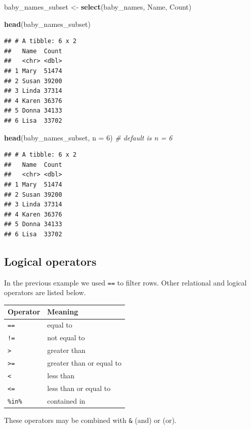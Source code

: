\documentclass[]{book}
\newenvironment{Shaded}{\begin{snugshade}}{\end{snugshade}}
\newcommand{\CommentTok}[1]{\textcolor[rgb]{0.56,0.35,0.01}{\textit{#1}}}
\newcommand{\DataTypeTok}[1]{\textcolor[rgb]{0.13,0.29,0.53}{#1}}
\newcommand{\DecValTok}[1]{\textcolor[rgb]{0.00,0.00,0.81}{#1}}
\newcommand{\KeywordTok}[1]{\textcolor[rgb]{0.13,0.29,0.53}{\textbf{#1}}}
\newcommand{\NormalTok}[1]{#1}
\newcommand{\StringTok}[1]{\textcolor[rgb]{0.31,0.60,0.02}{#1}}
\begin{document}
\begin{Shaded}
\begin{Highlighting}[]
\NormalTok{baby_names_subset <-}\StringTok{ }\KeywordTok{select}\NormalTok{(baby_names, Name, Count)}

\KeywordTok{head}\NormalTok{(baby_names_subset)}
\end{Highlighting}
\end{Shaded}

\begin{verbatim}
## # A tibble: 6 x 2
##   Name  Count
##   <chr> <dbl>
## 1 Mary  51474
## 2 Susan 39200
## 3 Linda 37314
## 4 Karen 36376
## 5 Donna 34133
## 6 Lisa  33702
\end{verbatim}

\begin{Shaded}
\begin{Highlighting}[]
\KeywordTok{head}\NormalTok{(baby_names_subset, }\DataTypeTok{n =} \DecValTok{6}\NormalTok{) }\CommentTok{# default is n = 6}
\end{Highlighting}
\end{Shaded}

\begin{verbatim}
## # A tibble: 6 x 2
##   Name  Count
##   <chr> <dbl>
## 1 Mary  51474
## 2 Susan 39200
## 3 Linda 37314
## 4 Karen 36376
## 5 Donna 34133
## 6 Lisa  33702
\end{verbatim}

\hypertarget{logical-operators}{%
\subsection{Logical operators}\label{logical-operators}}

In the previous example we used \texttt{==} to filter rows. Other relational
and logical operators are listed below.

\begin{longtable}[]{@{}ll@{}}
\toprule
Operator & Meaning\tabularnewline
\midrule
\endhead
\texttt{==} & equal to\tabularnewline
\texttt{!=} & not equal to\tabularnewline
\texttt{\textgreater{}} & greater than\tabularnewline
\texttt{\textgreater{}=} & greater than or equal to\tabularnewline
\texttt{\textless{}} & less than\tabularnewline
\texttt{\textless{}=} & less than or equal to\tabularnewline
\texttt{\%in\%} & contained in\tabularnewline
\bottomrule
\end{longtable}

These operators may be combined with \texttt{\&} (and) or \texttt{\textbar{}} (or).
\end{document}

